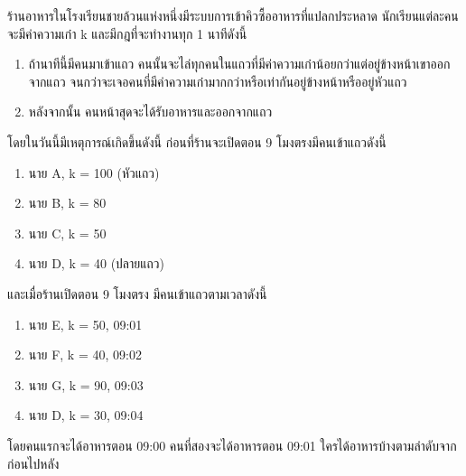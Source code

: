 \question ร้านอาหารในโรงเรียนชายล้วนแห่งหนึ่งมีระบบการเข้าคิวซื้ออาหารที่แปลกประหลาด นักเรียนแต่ละคนจะมีค่าความเก๋า k และมีกฎที่จะทำงานทุก 1 นาทีดังนี้
\begin{enumerate}
    \item ถ้านาทีนี้มีคนมาเข้าแถว คนนั้นจะไล่ทุกคนในแถวที่มีค่าความเก๋าน้อยกว่าแต่อยู่ข้างหน้าเขาออกจากแถว จนกว่าจะเจอคนที่มีค่าความเก๋ามากกว่าหรือเท่ากันอยู่ข้างหน้าหรืออยู่หัวแถว
    \item หลังจากนั้น คนหน้าสุดจะได้รับอาหารและออกจากแถว
\end{enumerate}
โดยในวันนี้มีเหตุการณ์เกิดขึ้นดังนี้ ก่อนที่ร้านจะเปิดตอน 9 โมงตรงมีคนเข้าแถวดังนี้
\begin{enumerate}
    \item นาย A, k = 100 (หัวแถว)
    \item นาย B, k = 80
    \item นาย C, k = 50
    \item นาย D, k = 40 (ปลายแถว)
\end{enumerate}
และเมื่อร้านเปิดตอน 9 โมงตรง มีคนเข้าแถวตามเวลาดังนี้
\begin{enumerate}
    \item นาย E, k = 50, 09:01
    \item นาย F, k = 40, 09:02
    \item นาย G, k = 90, 09:03
    \item นาย D, k = 30, 09:04
\end{enumerate}
โดยคนแรกจะได้อาหารตอน 09:00 คนที่สองจะได้อาหารตอน 09:01 ใครได้อาหารบ้างตามลำดับจากก่อนไปหลัง \\

